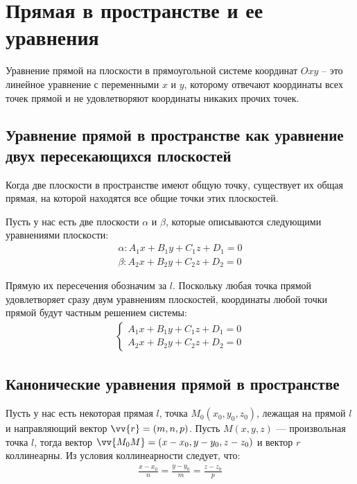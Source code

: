 \documentclass[a4paper,12pt,oneside]{extbook}
\theoremstyle{numbered}
\theoremstyle{unnumbered}
\theoremstyle{named}
\theoremstyle{unnumbered}
\theoremstyle{named}
\theoremstyle{named}
\theoremstyle{named}
\begin{document}

\section{Прямая в пространстве и ее уравнения}\label{sec:line_in_space}
Уравнение прямой на плоскости в прямоугольной системе координат \(Oxy\) – это линейное уравнение с переменными \(x\) и \(y\), которому отвечают координаты всех точек прямой и не удовлетворяют координаты никаких прочих точек.

\subsection{Уравнение прямой в пространстве как уравнение двух пересекающихся плоскостей}
Когда две плоскости в пространстве имеют общую точку, существует их общая прямая, на которой находятся все общие точки этих плоскостей.

Пусть у нас есть две плоскости \(\alpha\) и \(\beta\), которые описываются следующими уравнениями плоскости:
\begin{gather*}
    \alpha: A_1x + B_1y + C_1z + D_1 = 0 \\
    \beta: A_2x + B_2y + C_2z + D_2 = 0
\end{gather*}

Прямую их пересечения обозначим за \(l\). Поскольку любая точка прямой удовлетворяет сразу двум уравнениям плоскостей, координаты любой точки прямой будут частным решением системы:
\begin{gather*}
    \begin{cases}
        A_1x + B_1y + C_1z + D_1 = 0 \\
        A_2x + B_2y + C_2z + D_2 = 0
    \end{cases}
\end{gather*}

\subsection{Канонические уравнения прямой в пространстве}
Пусть у нас есть некоторая прямая \(l\), точка \(M_0(x_0, y_0, z_0)\), лежащая на прямой \(l\) и направляющий вектор \(\vv{r} = (m, n, p)\). Пусть \(M(x, y, z)\) — произвольная точка \(l\), тогда вектор \(\vv{M_0M} = (x - x_0, y - y_0, z - z_0)\) и вектор \(r\) коллинеарны. Из условия коллинеарности следует, что:
\begin{gather*}
    \frac{x - x_0}{n} = \frac{y - y_0}{m} = \frac{z - z_0}{p}
\end{gather*}
\end{document}
